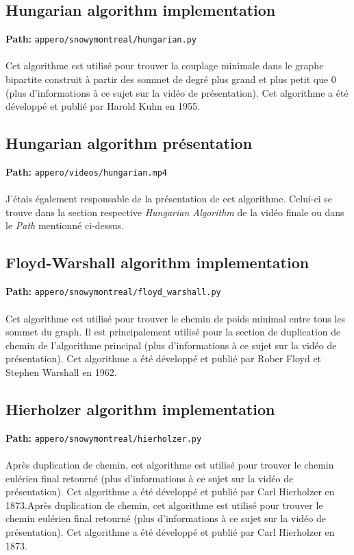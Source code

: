 \documentclass[11pt]{article}
\begin{document}
\subsection{Hungarian algorithm implementation}
\textbf{Path:} \texttt{appero/snowymontreal/hungarian.py}\\\\
Cet algorithme est utilisé pour trouver la couplage minimale dans le
graphe bipartite construit à partir des sommet de degré plus grand et plus petit
que 0 (plus d'informations à ce sujet sur la vidéo de présentation). Cet
algorithme a été développé et publié par Harold Kuhn en 1955.
\subsection{Hungarian algorithm présentation}
\textbf{Path:} \texttt{appero/videos/hungarian.mp4}\\\\
J'étais également responsable de la présentation de cet algorithme. Celui-ci se
trouve dans la section respective \textit{Hungarian Algorithm} de la vidéo
finale ou dans le \textit{Path} mentionné ci-dessus.
\subsection{Floyd-Warshall algorithm implementation}
\textbf{Path:} \texttt{appero/snowymontreal/floyd\_warshall.py}\\\\
Cet algorithme est utilisé pour trouver le chemin de poids minimal entre tous
les sommet du graph. Il est principalement utilisé pour la section de
duplication de chemin de l'algorithme principal (plus d'informations à ce sujet
sur la vidéo de présentation). Cet algorithme a été développé et publié par
Rober Floyd et Stephen Warshall en 1962.
\subsection{Hierholzer algorithm implementation}
\textbf{Path:} \texttt{appero/snowymontreal/hierholzer.py}\\\\
Après duplication de chemin, cet algorithme est utilisé pour trouver le chemin
eulérien final retourné (plus d'informations à ce sujet sur la vidéo de
présentation). Cet algorithme a été développé et publié par Carl Hierholzer en
1873.Après duplication de chemin, cet algorithme est utilisé pour trouver le
chemin eulérien final retourné (plus d'informations à ce sujet sur la vidéo de
présentation). Cet algorithme a été développé et publié par Carl Hierholzer en
1873.
\end{document}
